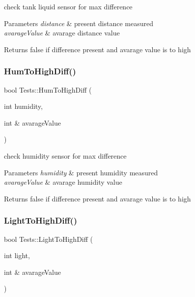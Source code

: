 check tank liquid sensor for max difference 


\begin{DoxyParams}{Parameters}
{\em distance} & present distance measured \\
\hline
{\em avarage\+Value} & avarage distance value \\
\hline
\end{DoxyParams}
\begin{DoxyReturn}{Returns}
false if difference present and avarage value is to high 
\end{DoxyReturn}
\mbox{\label{class_tests_ae4b5d0485e34ee8a4cd8a1e347da12b9}} 
\subsubsection{\texorpdfstring{Hum\+To\+High\+Diff()}{HumToHighDiff()}}
{\footnotesize\ttfamily bool Tests\+::\+Hum\+To\+High\+Diff (\begin{DoxyParamCaption}\item[{int}]{humidity,  }\item[{int \&}]{avarage\+Value }\end{DoxyParamCaption})}



check humidity sensor for max difference 


\begin{DoxyParams}{Parameters}
{\em humidity} & present humidity measured \\
\hline
{\em avarage\+Value} & avarage humidity value \\
\hline
\end{DoxyParams}
\begin{DoxyReturn}{Returns}
false if difference present and avarage value is to high 
\end{DoxyReturn}
\mbox{\label{class_tests_ae7ec7494687c1d3ba34419b5ac4860f2}} 
\subsubsection{\texorpdfstring{Light\+To\+High\+Diff()}{LightToHighDiff()}}
{\footnotesize\ttfamily bool Tests\+::\+Light\+To\+High\+Diff (\begin{DoxyParamCaption}\item[{int}]{light,  }\item[{int \&}]{avarage\+Value }\end{DoxyParamCaption})}



